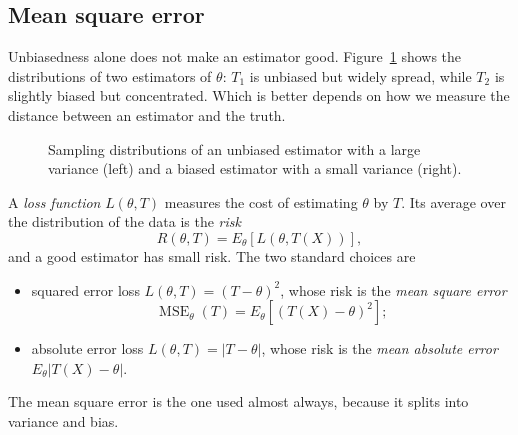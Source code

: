 \documentclass[12pt,a4paper]{report}
\theoremstyle{definition}
\DeclareMathOperator{\MSE}{MSE}
\begin{document}
\subsection{Mean square error}

Unbiasedness alone does not make an estimator good.
Figure~\ref{fig:biasvariance} shows the distributions of two estimators of
$\theta$: $T_1$ is unbiased but widely spread, while $T_2$ is slightly biased but
concentrated. Which is better depends on how we measure the distance between an
estimator and the truth.

\begin{figure}[H]
\centering
{}
\qquad
{}
\caption{Sampling distributions of an unbiased estimator with a large variance
(left) and a biased estimator with a small variance (right).}
\label{fig:biasvariance}
\end{figure}

A \emph{loss function} $L(\theta, T)$ measures the cost of estimating $\theta$ by
$T$. Its average over the distribution of the data is the \emph{risk}
\[R(\theta, T) = E_\theta\left[L(\theta, T(X))\right] ,\]
and a good estimator has small risk. The two standard choices are
\begin{itemize}
\item squared error loss $L(\theta, T) = (T - \theta)^2$, whose risk is the
\emph{mean square error}
\[\MSE_\theta(T) = E_\theta\left[(T(X) - \theta)^2\right] ;\]
\item absolute error loss $L(\theta, T) = |T - \theta|$, whose risk is the
\emph{mean absolute error} $E_\theta|T(X) - \theta|$.
\end{itemize}
The mean square error is the one used almost always, because it splits into
variance and bias.
\end{document}
